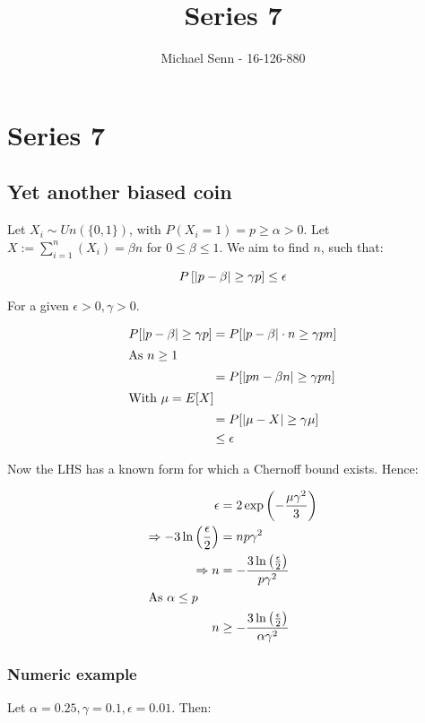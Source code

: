 \documentclass[a4paper]{scrreprt}
\title{Series 7}
\author{Michael Senn \maillink{michael.senn@students.unibe.ch} - 16-126-880}
\date{\printdate}
\DeclarePairedDelimiter\abs{\lvert}{\rvert}
\begin{document}
\maketitle


\setcounter{chapter}{6}
\chapter{Series 7}

\section{Yet another biased coin}

Let $X_i \sim Un(\{0, 1\})$, with $P(X_i = 1) = p \geq \alpha > 0$. Let $X :=
\sum_{i=1}^n(X_i) = \beta n$ for $0 \leq \beta \leq 1$. We aim to find $n$,
such that:

\[
	P\left[\abs{p - \beta} \geq \gamma p\right] \leq \epsilon
\]

For a given $\epsilon > 0, \gamma > 0$.

\begin{align*}
	P[\abs{p - \beta} \geq \gamma p] & = P[\abs{p - \beta} \cdot n \geq \gamma p n] \\
	\intertext{As $n \geq 1$}
	& = P[\abs{p n - \beta n} \geq \gamma p n] \\
	\intertext{With $\mu = E[X]$}
	& = P[\abs{\mu - X} \geq \gamma \mu] \\
	& \leq \epsilon \\
\end{align*}

Now the LHS has a known form for which a Chernoff bound exists. Hence:

\begin{align*}
	\epsilon & = 2 \exp\left(-\frac{\mu \gamma^2}{3}\right) \\
	\Rightarrow -3 \ln\left(\frac{\epsilon}{2}\right) & = n p \gamma^2 \\
	\Rightarrow n & = - \frac{3 \ln\left(\frac{\epsilon}{2}\right)}{p \gamma^2} \\
	\intertext{As $\alpha \leq p$}
	n & \geq - \frac{3 \ln\left(\frac{\epsilon}{2}\right)}{\alpha \gamma^2}
\end{align*}

\subsection{Numeric example}

Let $\alpha = 0.25, \gamma = 0.1, \epsilon = 0.01$. Then:
\end{document}
